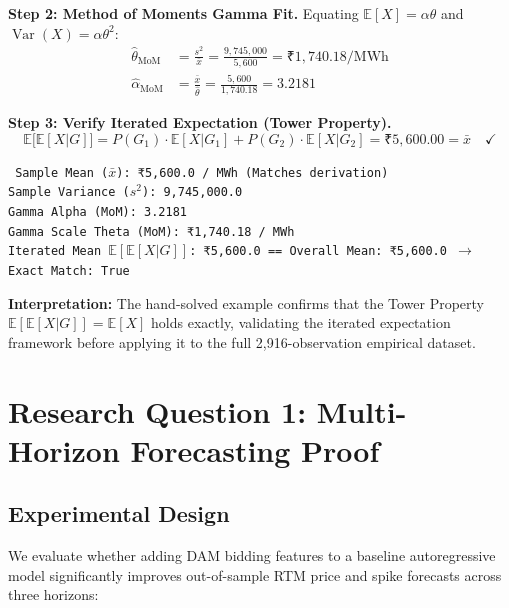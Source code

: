 \documentclass[12pt, a4paper]{article}
\theoremstyle{definition}
\newcommand{\MWh}{\text{MWh}}
\begin{document}
\textbf{Step 2: Method of Moments Gamma Fit.}
Equating $\mathbb{E}[X] = \alpha\theta$ and $\operatorname{Var}(X) = \alpha\theta^2$:
\begin{align}
    \hat{\theta}_{\text{MoM}} &= \frac{s^2}{\bar{x}} = \frac{9{,}745{,}000}{5{,}600} = \text{₹}1{,}740.18/\MWh \\
    \hat{\alpha}_{\text{MoM}} &= \frac{\bar{x}}{\hat{\theta}} = \frac{5{,}600}{1{,}740.18} = 3.2181
\end{align}

\textbf{Step 3: Verify Iterated Expectation (Tower Property).}
\begin{equation}
    \mathbb{E}\big[\mathbb{E}[X | G]\big] = P(G_1) \cdot \mathbb{E}[X|G_1] + P(G_2) \cdot \mathbb{E}[X|G_2] = \text{₹}5{,}600.00 = \bar{x} \quad \checkmark
\end{equation}

\begin{tcolorbox}[colback=lightbg, colframe=navy, title={\textbf{Python Verification Output (Cell 6)}}]
\small\texttt{%
Sample Mean ($\bar{x}$): ₹5,600.0 / MWh (Matches derivation)\\
Sample Variance ($s^2$): 9,745,000.0\\
Gamma Alpha (MoM): 3.2181\\
Gamma Scale Theta (MoM): ₹1,740.18 / MWh\\
Iterated Mean $\mathbb{E}[\mathbb{E}[X|G]]$: ₹5,600.0 == Overall Mean: ₹5,600.0 $\to$ Exact Match: True%
}
\end{tcolorbox}

\textbf{Interpretation:} The hand-solved example confirms that the Tower Property $\mathbb{E}[\mathbb{E}[X|G]] = \mathbb{E}[X]$ holds exactly, validating the iterated expectation framework before applying it to the full 2,916-observation empirical dataset.

\section{Research Question 1: Multi-Horizon Forecasting Proof}

\subsection{Experimental Design}

We evaluate whether adding DAM bidding features to a baseline autoregressive model significantly improves out-of-sample RTM price and spike forecasts across three horizons:
\end{document}
